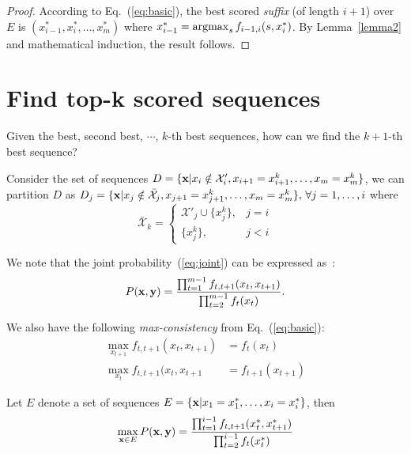 \begin{proof}
According to Eq.~(\ref{eq:basic}), the best scored \emph{suffix} (of length $i+1$) over $E$ is $(x_{i-1}^*,x_i^*,\dots,x_m^*)$
where $x_{i-1}^* = \operatorname*{argmax}_{s} f_{i-1, i}(s, x_i^*)$.
By Lemma~\ref{lemma2} and mathematical induction, the result follows.
\end{proof}


\section{Find top-k scored sequences}
\label{sec:topk}

Given the best, second best, $\cdots$, $k$-th best sequences, how can we find the $k\!+\!1$-th best sequence?

Consider the set of sequences $D = \{\mathbf{x} |x_i \notin \mathcal{X}'_i, x_{i+1} = x_{i+1}^k, \dots, x_m = x_m^k\}$,
we can partition $D$ as 
$D_j = \{\mathbf{x} |x_j \notin \bar{\mathcal{X}}_j, x_{j+1} = x_{j+1}^k, \dots, x_m = x_m^k \}, \, \forall j=1,\dots,i$
where 
\begin{equation*}
\bar{\mathcal{X}}_k = \begin{cases}
                       \mathcal{X}'_j \cup \{x_j^k\}, & j = i \\
                       \{x_j^k \}, & j < i
                      \end{cases}
\end{equation*}

We note that the joint probability~(\ref{eq:joint}) can be expressed as~\cite{nilsson2001sequentially}:
\begin{equation}
P(\mathbf{x}, \mathbf{y}) = \frac{\prod_{t=1}^{m-1} f_{t,t+1}(x_t, x_{t+1})} {\prod_{t=2}^{m-1} f_t(x_t)}.
\end{equation}

We also have the following \emph{max-consistency} from Eq.~(\ref{eq:basic}):
\begin{align}
\label{eq:consistency}
\max_{x_{t+1}} f_{t,t+1}(x_t, x_{t+1}) & = f_t(x_t) \\
\max_{x_t} f_{t,t+1}(x_t, x_{t+1}      & = f_{t+1}(x_{t+1})
\end{align}

\begin{lemma}
\label{lemma3}
Let $E$ denote a set of sequences $E = \{\mathbf{x} |x_1 = x_1^*, \dots, x_i = x_i^*\}$, then
\begin{equation*}
\max_{\mathbf{x} \in E} P(\mathbf{x},\mathbf{y}) = \frac{\prod_{t=1}^{i-1} f_{t,t+1}(x_t^*, x_{t+1}^*)} {\prod_{t=2}^{i-1} f_t(x_t^*)}
\end{equation*}
\end{lemma}

